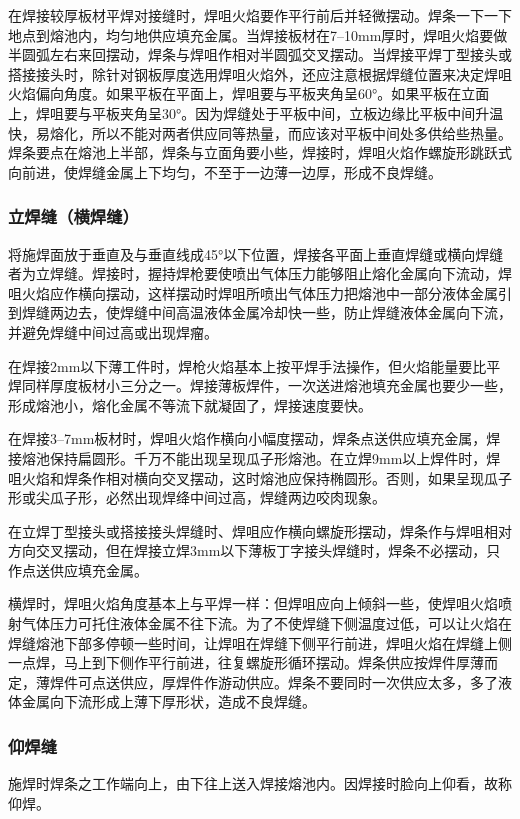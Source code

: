 \documentclass{ctexbook}
\begin{document}
在焊接较厚板材平焊对接缝时，焊咀火焰要作平行前后并轻微摆动。焊条一下一下地点到熔池内，均匀地供应填充金属。当焊接板材在7--10mm厚时，焊咀火焰要做半圆弧左右来回摆动，焊条与焊咀作相对半圆弧交叉摆动。当焊接平焊丁型接头或搭接接头时，除针对钢板厚度选用焊咀火焰外，还应注意根据焊缝位置来决定焊咀火焰偏向角度。如果平板在平面上，焊咀要与平板夹角呈60°。如果平板在立面上，焊咀要与平板夹角呈30°。因为焊缝处于平板中间，立板边缘比平板中间升温快，易熔化，所以不能对两者供应同等热量，而应该对平板中间处多供给些热量。焊条要点在熔池上半部，焊条与立面角要小些，焊接时，焊咀火焰作螺旋形跳跃式向前进，使焊缝金属上下均匀，不至于一边薄一边厚，形成不良焊缝。
\subsubsection{立焊缝（横焊缝）}
将施焊面放于垂直及与垂直线成45°以下位置，焊接各平面上垂直焊缝或横向焊缝者为立焊缝。焊接时，握持焊枪要使喷出气体压力能够阻止熔化金属向下流动，焊咀火焰应作横向摆动，这样摆动时焊咀所喷出气体压力把熔池中一部分液体金属引到焊缝两边去，使焊缝中间高温液体金属冷却快一些，防止焊缝液体金属向下流，并避免焊缝中间过高或出现焊瘤。

在焊接2mm以下薄工件时，焊枪火焰基本上按平焊手法操作，但火焰能量要比平焊同样厚度板材小三分之一。焊接薄板焊件，一次送进熔池填充金属也要少一些，形成熔池小，熔化金属不等流下就凝固了，焊接速度要快。

在焊接3--7mm板材时，焊咀火焰作横向小幅度摆动，焊条点送供应填充金属，焊接熔池保持扁圆形。千万不能出现呈现瓜子形熔池。在立焊9mm以上焊件时，焊咀火焰和焊条作相对横向交叉摆动，这时熔池应保持椭圆形。否则，如果呈现瓜子形或尖瓜子形，必然出现焊绛中间过高，焊缝两边咬肉现象。

在立焊丁型接头或搭接接头焊缝时、焊咀应作横向螺旋形摆动，焊条作与焊咀相对方向交叉摆动，但在焊接立焊3mm以下薄板丁字接头焊缝时，焊条不必摆动，只作点送供应填充金属。

横焊时，焊咀火焰角度基本上与平焊一样：但焊咀应向上倾斜一些，使焊咀火焰喷射气体压力可托住液体金属不往下流。为了不使焊缝下侧温度过低，可以让火焰在焊缝熔池下部多停顿一些时间，让焊咀在焊缝下侧平行前进，焊咀火焰在焊缝上侧一点焊，马上到下侧作平行前进，往复螺旋形循环摆动。焊条供应按焊件厚薄而定，薄焊件可点送供应，厚焊件作游动供应。焊条不要同时一次供应太多，多了液体金属向下流形成上薄下厚形状，造成不良焊缝。
\subsubsection{仰焊缝}
施焊时焊条之工作端向上，由下往上送入焊接熔池内。因焊接时脸向上仰看，故称仰焊。
\end{document}
